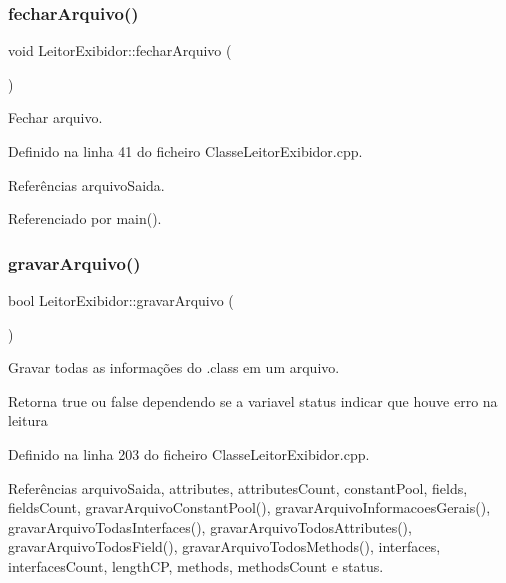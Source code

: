 \subsubsection{\texorpdfstring{fechar\+Arquivo()}{fecharArquivo()}}
{\footnotesize\ttfamily void Leitor\+Exibidor\+::fechar\+Arquivo (\begin{DoxyParamCaption}{ }\end{DoxyParamCaption})}



Fechar arquivo. 



Definido na linha 41 do ficheiro Classe\+Leitor\+Exibidor.\+cpp.



Referências arquivo\+Saida.



Referenciado por main().

\mbox{\label{classLeitorExibidor_a8dcf6961e13ad6830f62e7839448b235}} 
\subsubsection{\texorpdfstring{gravar\+Arquivo()}{gravarArquivo()}}
{\footnotesize\ttfamily bool Leitor\+Exibidor\+::gravar\+Arquivo (\begin{DoxyParamCaption}{ }\end{DoxyParamCaption})}



Gravar todas as informações do .class em um arquivo. 

\begin{DoxyReturn}{Retorna}
true ou false dependendo se a variavel status indicar que houve erro na leitura 
\end{DoxyReturn}


Definido na linha 203 do ficheiro Classe\+Leitor\+Exibidor.\+cpp.



Referências arquivo\+Saida, attributes, attributes\+Count, constant\+Pool, fields, fields\+Count, gravar\+Arquivo\+Constant\+Pool(), gravar\+Arquivo\+Informacoes\+Gerais(), gravar\+Arquivo\+Todas\+Interfaces(), gravar\+Arquivo\+Todos\+Attributes(), gravar\+Arquivo\+Todos\+Field(), gravar\+Arquivo\+Todos\+Methods(), interfaces, interfaces\+Count, length\+CP, methods, methods\+Count e status.




